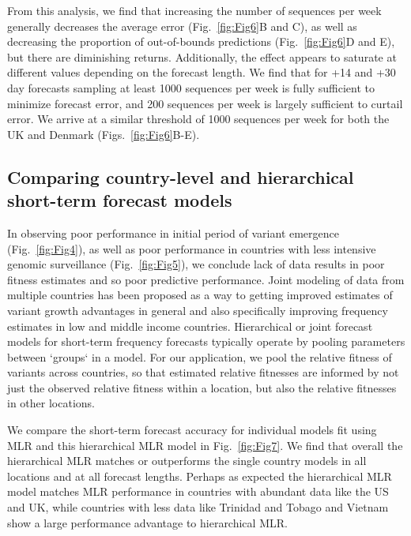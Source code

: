 From this analysis, we find that increasing the number of sequences per week generally decreases the average error (Fig.~\ref{fig:Fig6}B and C), as well as decreasing the proportion of out-of-bounds predictions (Fig.~\ref{fig:Fig6}D and E), but there are diminishing returns.
Additionally, the effect appears to saturate at different values depending on the forecast length.
We find that for +14 and +30 day forecasts sampling at least 1000 sequences per week is fully sufficient to minimize forecast error, and 200 sequences per week is largely sufficient to curtail error.
We arrive at a similar threshold of 1000 sequences per week for both the UK and Denmark (Figs.~\ref{fig:Fig6}B-E).


\subsection*{Comparing country-level and hierarchical short-term forecast models}

In observing poor performance in initial period of variant emergence (Fig.~\ref{fig:Fig4}), as well as poor performance in countries with less intensive genomic surveillance (Fig.~\ref{fig:Fig5}), we conclude lack of data results in poor fitness estimates and so poor predictive performance.
Joint modeling of data from multiple countries has been proposed as a way to getting improved estimates of variant growth advantages in general and also specifically improving frequency estimates in low and middle income countries.
Hierarchical or joint forecast models for short-term frequency forecasts typically operate by pooling parameters between `groups` in a model.
For our application, we pool the relative fitness of variants across countries, so that estimated relative fitnesses are informed by not just the observed relative fitness within a location, but also the relative fitnesses in other locations.

We compare the short-term forecast accuracy for individual models fit using MLR and this hierarchical MLR model in Fig.~\ref{fig:Fig7}.
We find that overall the hierarchical MLR matches or outperforms the single country models in all locations and at all forecast lengths.
Perhaps as expected the hierarchical MLR model matches MLR performance in countries with abundant data like the US and UK, while countries with less data like Trinidad and Tobago and Vietnam show a large performance advantage to hierarchical MLR.


